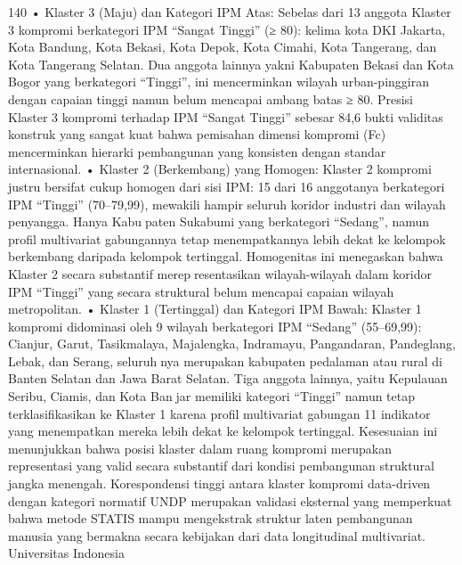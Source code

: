 140
• Klaster 3 (Maju) dan Kategori IPM Atas: Sebelas dari 13 anggota Klaster 3
kompromi berkategori IPM “Sangat Tinggi” (≥ 80): kelima kota DKI Jakarta,
Kota Bandung, Kota Bekasi, Kota Depok, Kota Cimahi, Kota Tangerang, dan Kota
Tangerang Selatan. Dua anggota lainnya yakni Kabupaten Bekasi dan Kota Bogor
yang berkategori “Tinggi”, ini mencerminkan wilayah urban-pinggiran dengan
capaian tinggi namun belum mencapai ambang batas ≥ 80. Presisi Klaster 3
kompromi terhadap IPM “Sangat Tinggi” sebesar 84,6%
bukti validitas konstruk yang sangat kuat bahwa pemisahan dimensi kompromi (Fc)
mencerminkan hierarki pembangunan yang konsisten dengan standar internasional.
• Klaster 2 (Berkembang) yang Homogen: Klaster 2 kompromi justru bersifat cukup
homogen dari sisi IPM: 15 dari 16 anggotanya berkategori IPM “Tinggi” (70–79,99),
mewakili hampir seluruh koridor industri dan wilayah penyangga. Hanya Kabupaten Sukabumi yang berkategori “Sedang”, namun profil multivariat gabungannya
tetap menempatkannya lebih dekat ke kelompok berkembang daripada kelompok
tertinggal. Homogenitas ini menegaskan bahwa Klaster 2 secara substantif merepresentasikan wilayah-wilayah dalam koridor IPM “Tinggi” yang secara struktural
belum mencapai capaian wilayah metropolitan.
• Klaster 1 (Tertinggal) dan Kategori IPM Bawah: Klaster 1 kompromi didominasi
oleh 9 wilayah berkategori IPM “Sedang” (55–69,99): Cianjur, Garut, Tasikmalaya,
Majalengka, Indramayu, Pangandaran, Pandeglang, Lebak, dan Serang, seluruhnya merupakan kabupaten pedalaman atau rural di Banten Selatan dan Jawa Barat
Selatan. Tiga anggota lainnya, yaitu Kepulauan Seribu, Ciamis, dan Kota Banjar memiliki kategori “Tinggi” namun tetap terklasifikasikan ke Klaster 1 karena
profil multivariat gabungan 11 indikator yang menempatkan mereka lebih dekat
ke kelompok tertinggal. Kesesuaian ini menunjukkan bahwa posisi klaster dalam
ruang kompromi merupakan representasi yang valid secara substantif dari kondisi
pembangunan struktural jangka menengah.
Korespondensi tinggi antara klaster kompromi data-driven dengan kategori normatif
UNDP merupakan validasi eksternal yang memperkuat bahwa metode STATIS mampu
mengekstrak struktur laten pembangunan manusia yang bermakna secara kebijakan dari
data longitudinal multivariat.
Universitas Indonesia

